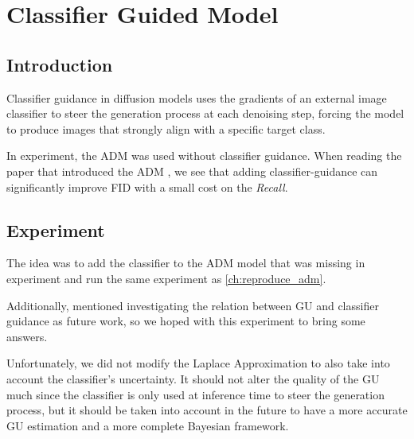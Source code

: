 \chapter{Classifier Guided Model}
\label{ch:classifier}


\section{Introduction}
\begin{tcolorbox}[colback=gray!10!white,colframe=gray!50!black,sharp corners]
Classifier guidance in diffusion models uses the gradients of an external image classifier to steer the generation process at each denoising step, forcing the model to produce images that strongly align with a specific target class.
\end{tcolorbox}

In \cite{jazbec_generative_2025} experiment, the \acs{ADM} was used without classifier guidance.
When reading the paper that introduced the \acs{ADM} \parencite{dhariwal_diffusion_2021}, we see that adding classifier-guidance can significantly improve \acs{FID} with a small cost on the \emph{Recall}. 

\section{Experiment}

The idea was to add the classifier to the \acs{ADM} model that was missing in \cite{jazbec_generative_2025} experiment and run the same experiment as \autoref{ch:reproduce_adm}.

Additionally, \cite{jazbec_generative_2025} mentioned investigating the relation between \acs{GU} and classifier guidance as future work, so we hoped with this experiment to bring some answers.

\begin{tcolorbox}[colback=orange!10!white,colframe=orange!50!black,sharp corners]
Unfortunately, we did not modify the Laplace Approximation to also take into account the classifier's uncertainty. It should not alter the quality of the \acs{GU} much since the classifier is only used at inference time to steer the generation process, but it should be taken into account in the future to have a more accurate \acs{GU} estimation and a more complete Bayesian framework.

\end{tcolorbox}

